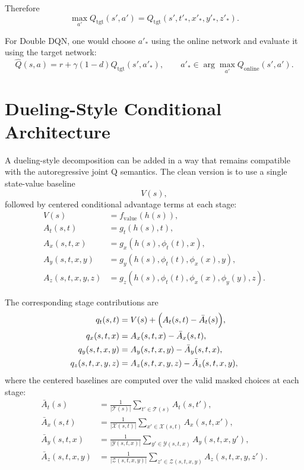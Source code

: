 \documentclass[11pt]{article}
\begin{document}
Therefore
\begin{equation}
\label{eq:target-expanded}
\max_{a'} Q_{\mathrm{tgt}}(s',a')
=
Q_{\mathrm{tgt}}(s',t'_*,x'_*,y'_*,z'_*).
\end{equation}

For Double DQN, one would choose $a'_*$ using the online network and evaluate it using the target network:
\begin{equation}
\label{eq:double-dqn-target}
\hat{Q}(s,a)
=
r + \gamma (1-d) Q_{\mathrm{tgt}}(s',a'_*),
\qquad
a'_* \in \arg\max_{a'} Q_{\mathrm{online}}(s',a').
\end{equation}

\section{Dueling-Style Conditional Architecture}
\label{sec:dueling-form}

A dueling-style decomposition can be added in a way that remains compatible with the autoregressive joint Q semantics. The clean version is to use a single state-value baseline
\[
V(s),
\]
followed by centered conditional advantage terms at each stage:
\begin{align}
V(s) &= f_{\mathrm{value}}(h(s)), \\
A_t(s,t) &= g_t(h(s), t), \\
A_x(s,t,x) &= g_x(h(s), \phi_t(t), x), \\
A_y(s,t,x,y) &= g_y(h(s), \phi_t(t), \phi_x(x), y), \\
A_z(s,t,x,y,z) &= g_z(h(s), \phi_t(t), \phi_x(x), \phi_y(y), z).
\end{align}

The corresponding stage contributions are
\begin{align}
q_t(s,t)
&=
V(s)
+
\Bigl(
A_t(s,t) - \bar{A}_t(s)
\Bigr), \label{eq:q_t-dueling}\\
q_x(s,t,x)
&=
A_x(s,t,x) - \bar{A}_x(s,t), \label{eq:q_x-dueling}\\
q_y(s,t,x,y)
&=
A_y(s,t,x,y) - \bar{A}_y(s,t,x), \\
q_z(s,t,x,y,z)
&=
A_z(s,t,x,y,z) - \bar{A}_z(s,t,x,y),
\end{align}
where the centered baselines are computed over the valid masked choices at each stage:
\begin{align}
\bar{A}_t(s)
&=
\frac{1}{|\mathcal{T}(s)|}
\sum_{t' \in \mathcal{T}(s)} A_t(s,t'), \\
\bar{A}_x(s,t)
&=
\frac{1}{|\mathcal{X}(s,t)|}
\sum_{x' \in \mathcal{X}(s,t)} A_x(s,t,x'), \\
\bar{A}_y(s,t,x)
&=
\frac{1}{|\mathcal{Y}(s,t,x)|}
\sum_{y' \in \mathcal{Y}(s,t,x)} A_y(s,t,x,y'), \\
\bar{A}_z(s,t,x,y)
&=
\frac{1}{|\mathcal{Z}(s,t,x,y)|}
\sum_{z' \in \mathcal{Z}(s,t,x,y)} A_z(s,t,x,y,z').
\end{align}
\end{document}
